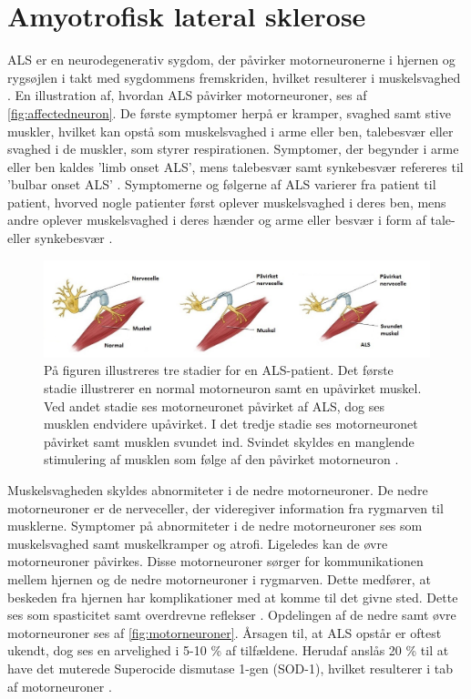 \section{Amyotrofisk lateral sklerose}
ALS er en neurodegenerativ sygdom, der påvirker motorneuronerne i hjernen og rygsøjlen i takt med sygdommens fremskriden, hvilket resulterer i muskelsvaghed \citep{henschke2012}. En illustration af, hvordan ALS påvirker motorneuroner, ses af \autoref{fig:affectedneuron}. De første symptomer herpå er kramper, svaghed samt stive muskler, hvilket kan opstå som muskelsvaghed i arme eller ben, talebesvær eller svaghed i de muskler, som styrer respirationen. Symptomer, der begynder i arme eller ben kaldes 'limb onset ALS', mens talebesvær samt synkebesvær refereres til 'bulbar onset ALS' \citep{nationalinstitute2016}. 
Symptomerne og følgerne af ALS varierer fra patient til patient, hvorved nogle patienter først oplever muskelsvaghed i deres ben, mens andre oplever muskelsvaghed i deres hænder og arme eller besvær i form af tale- eller synkebesvær \citep{miller2005, nationalinstitute2016}.

\begin{figure}[H]
\centering
\includegraphics[width=1\textwidth]{figures/affectedneuron}
\caption{På figuren illustreres tre stadier for en ALS-patient. Det første stadie illustrerer en normal motorneuron samt en upåvirket muskel. Ved andet stadie ses motorneuronet påvirket af ALS, dog ses musklen endvidere upåvirket. I det tredje stadie ses motorneuronet påvirket samt musklen svundet ind. Svindet skyldes en manglende stimulering af musklen som følge af den påvirket motorneuron \citep{drake2015}.}
\label{fig:affectedneuron}
\end{figure}
 
Muskelsvagheden skyldes abnormiteter i de nedre motorneuroner. De nedre motorneuroner er de nerveceller, der videregiver information fra rygmarven til musklerne. Symptomer på abnormiteter i de nedre motorneuroner ses som muskelsvaghed samt muskelkramper og atrofi.
Ligeledes kan de øvre motorneuroner påvirkes. Disse motorneuroner sørger for kommunikationen mellem hjernen og de nedre motorneuroner i rygmarven. Dette medfører, at beskeden fra hjernen har komplikationer med at komme til det givne sted. Dette ses som spasticitet samt overdrevne reflekser \citep{nationalinstitute2016}. Opdelingen af de nedre samt øvre motorneuroner ses af \autoref{fig:motorneuroner}.
Årsagen til, at ALS opstår er oftest ukendt, dog ses en arvelighed i 5-10 \% af tilfældene. Herudaf anslås 20 \% til at have det muterede Superocide dismutase 1-gen (SOD-1), hvilket resulterer i tab af motorneuroner \citep{miller2005}.

